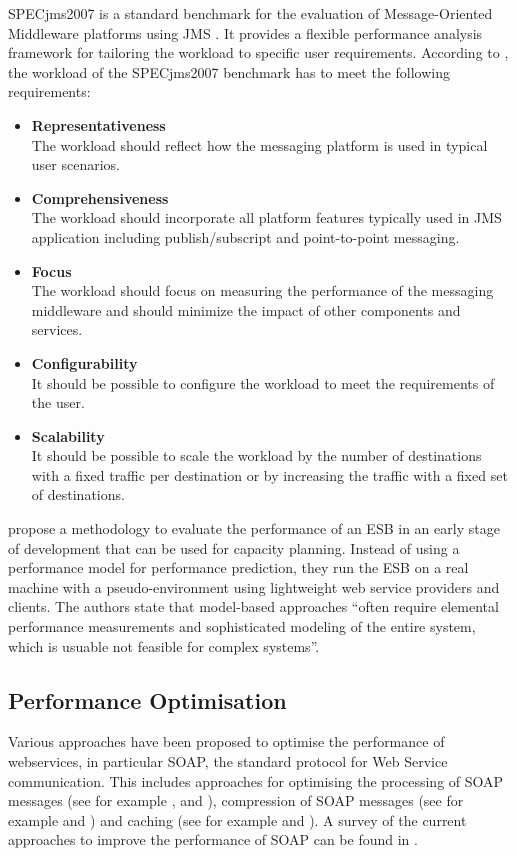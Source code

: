 SPECjms2007 is a standard benchmark for the evaluation of Message-Oriented Middleware platforms using \ac{JMS} \citep{Sachs:2009rr}. It provides a flexible performance analysis framework for tailoring the workload to specific user requirements. According to \cite{sachs2007designing}, the workload of the SPECjms2007 benchmark has to meet the following requirements:
\begin{itemize}
	\item \textbf{Representativeness}\\
	The workload should reflect how the messaging platform is used in typical user scenarios.
	\item \textbf{Comprehensiveness}\\
	The workload should incorporate all platform features typically used in JMS application including publish/subscript and point-to-point messaging.
	\item \textbf{Focus}\\
	The workload should focus on measuring the performance of the messaging middleware and should minimize the impact of other components and services.
	\item \textbf{Configurability}\\
	It should be possible to configure the workload to meet the requirements of the user.
	\item \textbf{Scalability}\\
	It should be possible to scale the workload by the number of destinations with a fixed traffic per destination or by increasing the traffic with a fixed set of destinations.
\end{itemize}

\cite{Ueno:2006ly} propose a methodology to evaluate the performance of an ESB in an early stage of development that can be used for capacity planning. Instead of using a performance model for performance prediction, they run the ESB on a real machine with a pseudo-environment using lightweight web service providers and clients. The authors state that model-based approaches ``often require elemental performance measurements and sophisticated modeling of the entire system, which is usuable not feasible for complex systems''.

\subsection{Performance Optimisation}
Various approaches have been proposed to optimise the performance of webservices, in particular SOAP, the standard protocol for Web Service communication. This includes approaches for optimising the processing of SOAP messages (see for example \cite{Abu-Ghazaleh:2005bs}, \cite{Suzumura:2005fv} and \cite{Ng:2006kl}), compression of SOAP messages (see for example \cite{Estrella:2008dz} and \cite{Ng:2005qa}) and caching (see for example \cite{andresen2004lye} and \cite{Devaram:2003fu}). A survey of the current approaches to improve the performance of SOAP can be found in \cite{Tekli:2012bh}.


